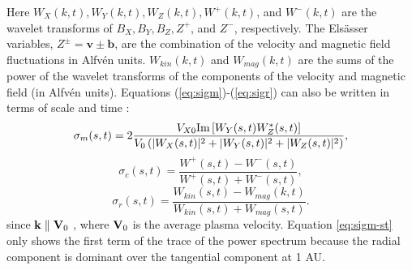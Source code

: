 \noindent Here $W_X(k,t),W_Y(k,t),W_Z(k,t),W^+(k,t)$, and $W^-(k,t)$ are the wavelet transforms of $B_X,B_Y,B_Z,Z^+$, and $Z^-$, respectively. The Els\"asser variables, $Z^\pm = \mathbf{v} \pm \mathbf{b}$, are the combination of the velocity and magnetic field fluctuations in Alfv\'en units. $W_{kin}(k,t)$ and $W_{mag}(k,t)$ are the sums of the power of the wavelet transforms of the components of the velocity and magnetic field (in Alfv\'en units). Equations (\ref{eq:sigm})-(\ref{eq:sigr}) can also be written in terms of scale and time : %
\begin{equation}
    \sigma_m(s,t) = 2\frac{ V_{X0}\textnormal{Im}\pp{W_Y(s,t)W_Z^*(s,t)}}{V_0 \p{|W_X(s,t)|^2 + |W_Y(s,t)|^2 + |W_Z(s,t)|^2}}, %
    \label{eq:sigm-st}
\end{equation}
\begin{equation}
    \sigma_c(s,t) = \frac{W^+(s,t)-W^-(s,t)}{W^+(s,t)+W^-(s,t)} ,
\end{equation}
 \begin{equation}
    \sigma_r(s,t) = \frac{W_{kin}(s,t) - W_{mag}(k,t)}{W_{kin}(s,t) + W_{mag}(s,t)} .
\end{equation}
since $\mathbf{k} \parallel \mathbf{V}_0$ \citep{Zhao:2021, Horbury:2008, Taylor:1938}, where $\mathbf{V}_0$ is the average plasma velocity. Equation \ref{eq:sigm-st} only shows the first term of the trace of the power spectrum because the radial component is dominant over the tangential component at 1 AU.



